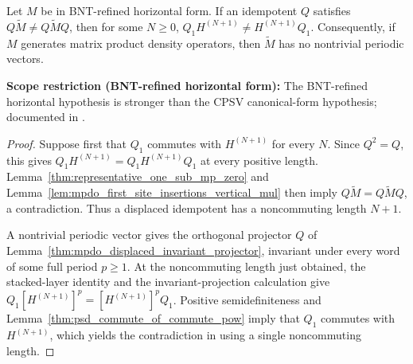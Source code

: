 \begin{lemma}
    \label{thm:mpdo_vertical_no_periodic_vectors_horizontal_cf}
    \leanok
    Let $M$ be in BNT-refined horizontal form. If an idempotent
    $Q$ satisfies
    $Q\widetilde M\ne Q\widetilde MQ$, then for some $N\ge 0$,
    $Q_1H^{(N+1)}\ne H^{(N+1)}Q_1$.
    Consequently, if $M$ generates matrix product density operators, then
    $\widetilde M$ has no nontrivial periodic vectors.

    \textbf{Scope restriction (BNT-refined horizontal form):}
    The BNT-refined horizontal hypothesis is stronger than the
    CPSV canonical-form hypothesis; documented in
    \cite{gap:cpgsv17_vertical_cf_grouping}.
\end{lemma}

\begin{proof}
    \leanok
    Suppose first that $Q_1$ commutes with $H^{(N+1)}$ for every $N$.
    Since $Q^2=Q$, this gives
    $Q_1H^{(N+1)}=Q_1H^{(N+1)}Q_1$ at every positive length.
    Lemma~\ref{thm:representative_one_sub_mp_zero} and
    Lemma~\ref{lem:mpdo_first_site_insertions_vertical_mul} then imply
    $Q\widetilde M=Q\widetilde MQ$, a contradiction. Thus a displaced
    idempotent has a noncommuting length $N+1$.

    A nontrivial periodic vector gives the orthogonal projector $Q$ of
    Lemma~\ref{thm:mpdo_displaced_invariant_projector}, invariant under
    every word of some full period $p\ge1$. At the noncommuting length just
    obtained, the stacked-layer identity and the invariant-projection
    calculation give
    $Q_1[H^{(N+1)}]^p=[H^{(N+1)}]^pQ_1$.
    Positive semidefiniteness and
    Lemma~\ref{thm:psd_commute_of_commute_pow} imply that $Q_1$ commutes
    with $H^{(N+1)}$, which yields the contradiction in
    \cite[Proposition~4.13, lines~1888--1893]{Cirac2016MPDO_arXiv} using a
    single noncommuting length.
\end{proof}

